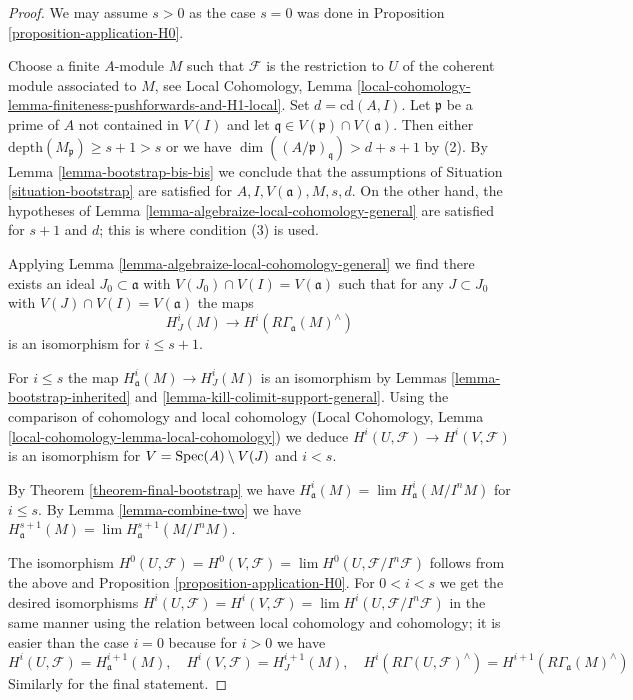 \begin{proof}
We may assume $s > 0$ as the case $s = 0$ was done in
Proposition \ref{proposition-application-H0}.

\medskip\noindent
Choose a finite $A$-module $M$ such that $\mathcal{F}$ is the restriction
to $U$ of the coherent module associated to $M$, see Local Cohomology,
Lemma \ref{local-cohomology-lemma-finiteness-pushforwards-and-H1-local}.
Set $d = \text{cd}(A, I)$.
Let $\mathfrak p$ be a prime of $A$ not contained in $V(I)$
and let $\mathfrak q \in V(\mathfrak p) \cap V(\mathfrak a)$.
Then either $\text{depth}(M_\mathfrak p) \geq s + 1 > s$
or we have $\dim((A/\mathfrak p)_\mathfrak q) > d + s + 1$ by (2).
By Lemma \ref{lemma-bootstrap-bis-bis} we conclude that the
assumptions of Situation \ref{situation-bootstrap}
are satisfied for $A, I, V(\mathfrak a), M, s, d$.
On the other hand, the hypotheses of
Lemma \ref{lemma-algebraize-local-cohomology-general}
are satisfied for $s + 1$ and $d$; this is where condition (3) is used.

\medskip\noindent
Applying Lemma \ref{lemma-algebraize-local-cohomology-general}
we find there exists an ideal
$J_0 \subset \mathfrak a$ with $V(J_0) \cap V(I) = V(\mathfrak a)$
such that for any $J \subset J_0$ with $V(J) \cap V(I) = V(\mathfrak a)$
the maps
$$
H^i_J(M) \longrightarrow H^i(R\Gamma_\mathfrak a(M)^\wedge)
$$
is an isomorphism for $i \leq s + 1$.

\medskip\noindent
For $i \leq s$ the map $H^i_\mathfrak a(M) \to H^i_J(M)$
is an isomorphism by Lemmas \ref{lemma-bootstrap-inherited} and
\ref{lemma-kill-colimit-support-general}.
Using the comparison of cohomology and local cohomology
(Local Cohomology, Lemma \ref{local-cohomology-lemma-local-cohomology})
we deduce
$H^i(U, \mathcal{F}) \to H^i(V,\mathcal{F})$
is an isomorphism for $V = \mathop{\mathrm{Spec}}(A) \setminus V(J)$ and
$i < s$.

\medskip\noindent
By Theorem \ref{theorem-final-bootstrap} we have
$H^i_\mathfrak a(M) = \lim H^i_\mathfrak a(M/I^nM)$
for $i \leq s$. By Lemma \ref{lemma-combine-two} we have
$H^{s + 1}_\mathfrak a(M) = \lim H^{s + 1}_\mathfrak a(M/I^nM)$.

\medskip\noindent
The isomorphism $H^0(U, \mathcal{F}) = H^0(V, \mathcal{F}) =
\lim H^0(U, \mathcal{F}/I^n\mathcal{F})$ follows from the above and
Proposition \ref{proposition-application-H0}.
For $0 < i < s$ we get the desired isomorphisms
$H^i(U, \mathcal{F}) = H^i(V, \mathcal{F}) =
\lim H^i(U, \mathcal{F}/I^n\mathcal{F})$ in
the same manner using the relation between local cohomology
and cohomology; it is easier than the case $i = 0$
because for $i > 0$ we have
$$
H^i(U, \mathcal{F}) = H^{i + 1}_\mathfrak a(M),
\quad
H^i(V, \mathcal{F}) = H^{i + 1}_J(M),
\quad
H^i(R\Gamma(U, \mathcal{F})^\wedge) = 
H^{i + 1}(R\Gamma_\mathfrak a(M)^\wedge)
$$
Similarly for the final statement.
\end{proof}

